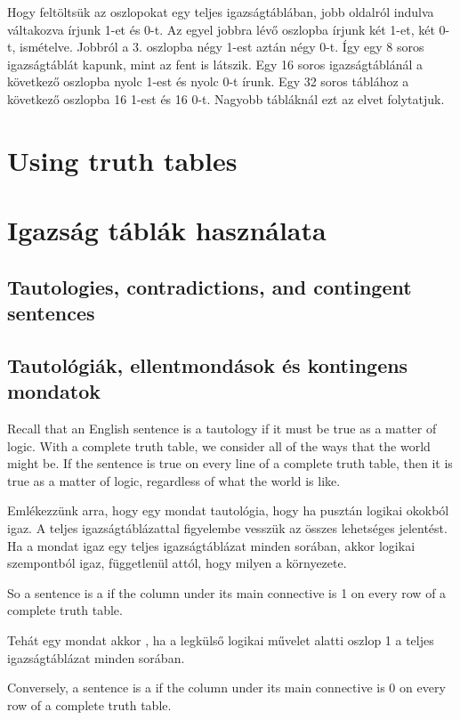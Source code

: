 Hogy feltöltsük az oszlopokat egy teljes igazságtáblában, jobb oldalról indulva váltakozva írjunk 1-et és 0-t. Az egyel jobbra lévő oszlopba írjunk két 1-et, két 0-t, ismételve. Jobbról a 3. oszlopba négy 1-est aztán négy 0-t. Így egy 8 soros igazságtáblát kapunk, mint az fent is látszik. Egy 16 soros igazságtáblánál a következő oszlopba nyolc 1-est és nyolc 0-t írunk. Egy 32 soros táblához a következő oszlopba 16 1-est és 16 0-t. Nagyobb tábláknál ezt az elvet folytatjuk.



\section*{Using truth tables}
\section{Igazság táblák használata}

\subsection*{Tautologies, contradictions, and contingent sentences}
\subsection{Tautológiák, ellentmondások és kontingens mondatok}
Recall that an English sentence is a tautology if it must be true as a matter of logic. With a complete truth table, we consider all of the ways that the world might be. If the sentence is true on every line of a complete truth table, then it is true as a matter of logic, regardless of what the world is like.

Emlékezzünk arra, hogy egy mondat tautológia, hogy ha pusztán logikai okokból igaz. A teljes igazságtáblázattal figyelembe vesszük az összes lehetséges jelentést. Ha a mondat igaz egy teljes igazságtáblázat minden sorában, akkor logikai szempontból igaz, függetlenül attól, hogy milyen a környezete.

So a sentence is a  if the column under its main connective is 1 on every row of a complete truth table.

Tehát egy mondat akkor , ha a legkülső logikai művelet alatti oszlop 1 a teljes igazságtáblázat minden sorában.

Conversely, a sentence is a  if the column under its main connective is 0 on every row of a complete truth table.


